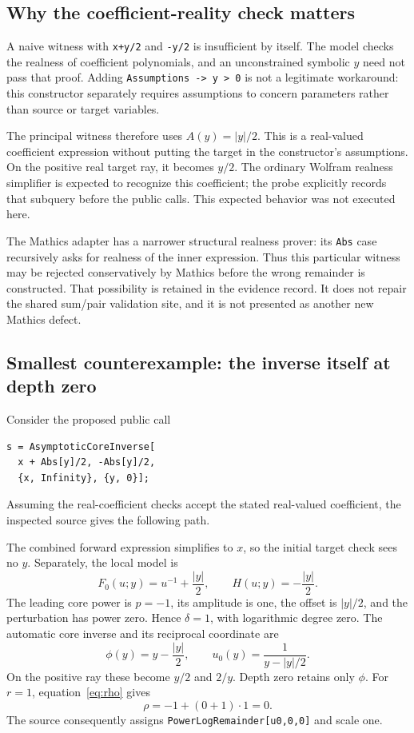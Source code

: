 \documentclass[11pt,letterpaper]{article}
\newcommand{\code}[1]{\nolinkurl{#1}}
\begin{document}
\subsection{Why the coefficient-reality check matters}
A naive witness with \code{x+y/2} and \code{-y/2} is insufficient by itself. The model checks the realness of coefficient polynomials, and an unconstrained symbolic \(y\) need not pass that proof. Adding \code{Assumptions -> y > 0} is not a legitimate workaround: this constructor separately requires assumptions to concern parameters rather than source or target variables.\cite{core,coefficients}

The principal witness therefore uses \(A(y)=|y|/2\). This is a real-valued coefficient expression without putting the target in the constructor's assumptions. On the positive real target ray, it becomes \(y/2\). The ordinary Wolfram realness simplifier is expected to recognize this coefficient; the probe explicitly records that subquery before the public calls. This expected behavior was not executed here.

The Mathics adapter has a narrower structural realness prover: its \code{Abs} case recursively asks for realness of the inner expression. Thus this particular witness may be rejected conservatively by Mathics before the wrong remainder is constructed. That possibility is retained in the evidence record. It does not repair the shared sum/pair validation site, and it is not presented as another new Mathics defect.\cite{mathicsassumptions}

\subsection{Smallest counterexample: the inverse itself at depth zero}
Consider the proposed public call
\begin{lstlisting}
s = AsymptoticCoreInverse[
  x + Abs[y]/2, -Abs[y]/2,
  {x, Infinity}, {y, 0}];
\end{lstlisting}
Assuming the real-coefficient checks accept the stated real-valued coefficient, the inspected source gives the following path.

The combined forward expression simplifies to \(x\), so the initial target check sees no \(y\). Separately, the local model is
\[
 F_0(u;y)=u^{-1}+\frac{|y|}{2},\qquad
 H(u;y)=-\frac{|y|}{2}.
\]
The leading core power is \(p=-1\), its amplitude is one, the offset is \(|y|/2\), and the perturbation has power zero. Hence \(\delta=1\), with logarithmic degree zero. The automatic core inverse and its reciprocal coordinate are
\[
 \phi(y)=y-\frac{|y|}{2},\qquad
 u_0(y)=\frac{1}{y-|y|/2}.
\]
On the positive ray these become \(y/2\) and \(2/y\). Depth zero retains only \(\phi\). For \(r=1\), equation~\eqref{eq:rho} gives
\[
 \rho=-1+(0+1)\cdot1=0.
\]
The source consequently assigns \code{PowerLogRemainder[u0,0,0]} and scale one.\cite{core}
\end{document}
